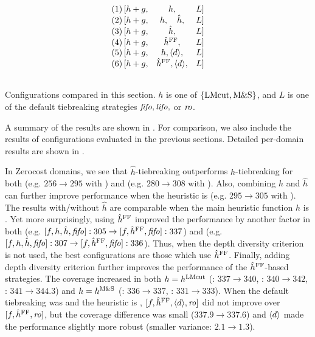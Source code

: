 \begin{table}[htbp]
 \centering
 \[
 \begin{array}{lcll}
  (1)\, [h+g, & h,                           &L] \\\relax
  (2)\, [h+g, & h,     \quad   \hat{h},      &L] \\\relax
  (3)\, [h+g, & \hat{h},                     &L] \\\relax
  (4)\, [h+g, & \hat{h}^{\text{FF}},               &L] \\\relax
  (5)\, [h+g, & h, {\left<d\right>}, &L] \\\relax
  (6)\, [h+g, & \hat{h}^{\text{FF}}, {\left<d\right>}, &L] \\\relax
 \end{array}  
 \]
 \caption{Configurations compared in this section. $h$ is
 one of ${\left\{\text{LMcut}, \text{M\&S}\right\}}$, and $L$ is one of the default
 tiebreaking strategies ${\text{\textit{fifo}}},{\text{\textit{lifo}}},$ or ${\text{\textit{ro}}}$. }
 \label{list:distance-configs}
\end{table}


A summary of the results are shown in . For
comparison, we also include the results of configurations evaluated in the previous sections.
Detailed per-domain results are shown in
.

In Zerocost domains, we see that $\hat{h}$-tiebreaking outperforms $h$-tiebreaking for both \lmcut (e.g. $256\rightarrow 295$ with \fifo) and \mands (e.g. $280\rightarrow 308$ with \fifo). Also,
combining $h$ and $\hat{h}$ can further improve performance when the heuristic is  \lmcut (e.g. $295\rightarrow 305$ with \fifo).  The results with/without $\hat{h}$ are comparable when
the main heuristic function $h$ is \mands.  
% 
Yet more surprisingly, using $\hat{h}^{\text{FF}}$ improved the performance by another factor in both \lmcut
(e.g. $[f,h,\hat{h},{\text{\textit{fifo}}}]:305 \rightarrow [f,\hat{h}^{\text{FF}},{\text{\textit{fifo}}}]:337$) and \mands 
(e.g. $[f,h,\hat{h},{\text{\textit{fifo}}}]:307 \rightarrow [f,\hat{h}^{\text{FF}},{\text{\textit{fifo}}}]:336$).
% 
Thus, when the depth diversity criterion  is not used, the best configurations are those
which use $\hat{h}^{\text{FF}}$.
% 
Finally, adding depth diversity criterion further improves the performance of the $\hat{h}^{\text{FF}}$-based strategies.
 The coverage increased in both $h=h^\text{LMcut}$ (\fifo: $337\rightarrow 340$, \lifo: $340\rightarrow
342$, \ro: $341\rightarrow 344.3$) and $h=h^\text{M\&S}$ (\fifo: $336\rightarrow 337$, \lifo: $331\rightarrow
333$). When the default tiebreaking was \ro and the heuristic is \mands, $[f,\hat{h}^{\text{FF}},{\left<d\right>},{\text{\textit{ro}}}]$ did not improve
over $[f,\hat{h}^{\text{FF}},{\text{\textit{ro}}}]$, but the coverage difference was small ($337.9\rightarrow 337.6$) and ${\left<d\right>}$ made the performance slightly more robust (smaller variance: $2.1\rightarrow 1.3$).

